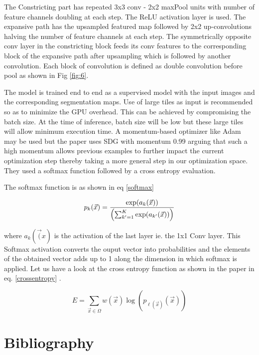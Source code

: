 \documentclass[19pt]{article}
\begin{document}
The Constricting part has repeated 3x3 conv - 2x2 maxPool units with number of feature channels doubling at each step. The ReLU activation layer is used. The expansive path has the upsampled featured map followed by 2x2 up-convolutions halving the number of feature channels at each step. The symmetrically opposite conv layer in the constricting block feeds its conv features to the corresponding block of the expansive path after upsampling which is followed by another convolution. Each block of convolution is defined as double convolution before pool as shown in Fig \ref{fig:6}.

The model is trained end to end as a supervised model with the input images and the corresponding segmentation maps. Use of large tiles as input is recommended so as to minimize the GPU overhead. This can be achieved by compromising the batch size. At the time of inference, batch size will be low but these large tiles will allow minimum execution time. A momentum-based optimizer like Adam may be used but the paper uses SDG with momentum 0.99 arguing that such a high momentum allows previous examples to further impact the current optimization step thereby taking a more general step in our optimization space. They used a softmax function followed by a cross entropy evaluation. 

The softmax function is as shown in eq \ref{softmax}

\begin{equation}
    \label{softmax}
        {p}_k(\vec{x}) = {\exp({a_k(\vec{x})}) \over \left(\sum_{k' =     1}^K \exp(a_{k'}(\vec{x}))\right)}
\end{equation}

where $a_k(\vec(x)$ is the activation of the last layer ie. the 1x1 Conv layer. This Softmax activation converts the ouput vector into probabilities and the elements of the obtained vector adds up to 1 along the dimension in which softmax is applied. Let us have a look at the cross entropy function as shown in the paper in eq. \ref{crossentropy} .

\begin{equation} 
    \label{crossentropy} 
        E = \sum_{\vec{x} \in \Omega} w(\vec{x}) \log({p}_{\ell(\vec{x})}(\vec{x}))  
\end{equation}
\newpage
\section{Bibliography}
  


\end{document}
